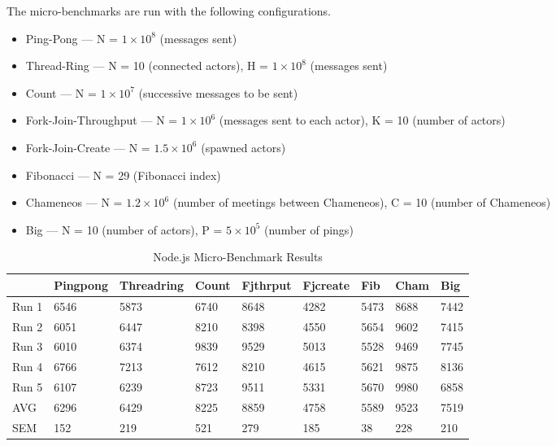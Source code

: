 \documentclass[oneside]{um-fict}
\begin{document}
The micro-benchmarks are run with the following configurations.
\begin{itemize}
    \item Ping-Pong --- N = $1\times10^8$ (messages sent)
    \item Thread-Ring --- N = 10 (connected actors), H = $1\times10^8$ (messages sent)
    \item Count --- N = $1\times10^7$ (successive messages to be sent)
    \item Fork-Join-Throughput --- N = $1\times10^6$ (messages sent to each actor), K = 10 (number of actors)
    \item Fork-Join-Create --- N = $1.5\times10^6$ (spawned actors)
    \item Fibonacci --- N = 29 (Fibonacci index)
    \item Chameneos --- N = $1.2\times10^6$ (number of meetings between Chameneos), C = 10 (number of Chameneos)
    \item Big --- N = 10 (number of actors), P = $5\times10^5$ (number of pings) 
\end{itemize}
\begin{table}[H]
    \begin{center}
    \begin{tabular}{|l|llllllll|}
    \hline
          & Pingpong & Threadring & Count  & Fjthrput & Fjcreate & Fib    & Cham & Big    \\ \hline
    Run 1 & 6546     & 5873       & 6740   & 8648     & 4282     & 5473   & 8688      & 7442   \\
    Run 2 & 6051     & 6447       & 8210   & 8398     & 4550     & 5654   & 9602      & 7415   \\
    Run 3 & 6010     & 6374       & 9839   & 9529     & 5013     & 5528   & 9469      & 7745   \\
    Run 4 & 6766     & 7213       & 7612   & 8210     & 4615     & 5621   & 9875      & 8136   \\
    Run 5 & 6107     & 6239       & 8723   & 9511     & 5331     & 5670   & 9980      & 6858   \\ \hline
    AVG   & 6296   & 6429     & 8225 & 8859   & 4758   & 5589 & 9523    & 7519 \\
    SEM   & 152   & 219     & 521 & 279   & 185   & 38  & 228    & 210  \\ \hline
    \end{tabular}
    \caption{Node.js Micro-Benchmark Results}\label{tab:nodemicro}
\end{center}
\end{table}
\end{document}
